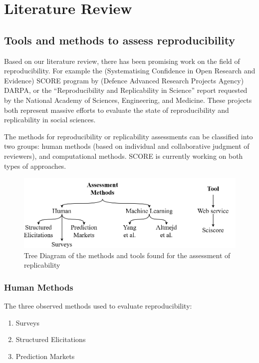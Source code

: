 \documentclass[
10pt, %
a4paper, %
oneside, %
headinclude,footinclude, %
BCOR5mm, %
]{scrartcl}
\begin{document}

\section{Literature Review}
\subsection{Tools and methods to assess reproducibility}
Based on our literature review, there has been promising work on the field of reproducibility. For example the (Systematising Confidence in Open Research and Evidence) SCORE \cite{SCORE} program by (Defence Advanced Research Projects Agency) DARPA, or the “Reproducibility and Replicability in Science” report requested by the National Academy of Sciences, Engineering, and Medicine. 
These projects both represent massive efforts to evaluate the state of reproducibility and replicability in social sciences.

The methods for reproducibility or replicability assessments can be classified into two groups: human methods (based on individual and collaborative judgment of reviewers), and computational methods. SCORE is currently working on both types of approaches. 
\begin{figure}[!htb]
  \includegraphics[width=\linewidth]{Figures/assessmens_methods_tree.png}
  \caption{Tree Diagram of the methods and tools found for the assessment of replicability}
\end{figure}


\subsubsection{Human Methods}
The three observed methods used to evaluate reproducibility:
\begin{enumerate}[noitemsep] %
\item Surveys
\item Structured Elicitations
\item Prediction Markets
\end{enumerate}
\end{document}
